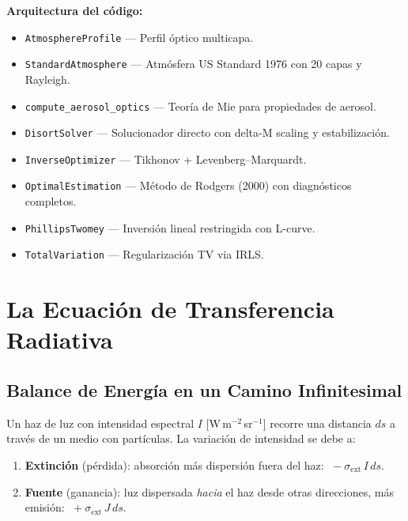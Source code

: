\documentclass[a4paper,11pt]{article}
\begin{document}
\textbf{Arquitectura del c\'odigo:}
\begin{itemize}
    \item \texttt{AtmosphereProfile} --- Perfil \'optico multicapa.
    \item \texttt{StandardAtmosphere} --- Atm\'osfera US Standard 1976 con 20 capas y Rayleigh.
    \item \texttt{compute\_aerosol\_optics} --- Teor\'ia de Mie para propiedades de aerosol.
    \item \texttt{DisortSolver} --- Solucionador directo con delta-M scaling y estabilizaci\'on.
    \item \texttt{InverseOptimizer} --- Tikhonov + Levenberg--Marquardt.
    \item \texttt{OptimalEstimation} --- M\'etodo de Rodgers (2000) con diagn\'osticos completos.
    \item \texttt{PhillipsTwomey} --- Inversi\'on lineal restringida con L-curve.
    \item \texttt{TotalVariation} --- Regularizaci\'on TV via IRLS.
\end{itemize}




\section{La Ecuaci\'on de Transferencia Radiativa}

\subsection{Balance de Energ\'ia en un Camino Infinitesimal}

Un haz de luz con intensidad espectral $I$ [W\,m$^{-2}$\,sr$^{-1}$] recorre
una distancia $ds$ a trav\'es de un medio con part\'iculas.  La variaci\'on de
intensidad se debe a:

\begin{enumerate}
    \item \textbf{Extinci\'on} (p\'erdida): absorci\'on m\'as dispersi\'on fuera
          del haz:  $\;-\sigma_{\text{ext}}\,I\,ds$.
    \item \textbf{Fuente} (ganancia): luz dispersada \emph{hacia} el haz desde
          otras direcciones, m\'as emisi\'on: $\;+\sigma_{\text{ext}}\,J\,ds$.
\end{enumerate}
\end{document}
